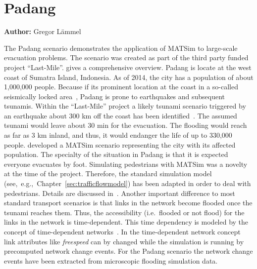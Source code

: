 \section{Padang}
\label{sec:padang}
\hfill \textbf{Author:} Gregor Lämmel

The Padang scenario demonstrates the application of MATSim to large-scale evacuation problems. The scenario was created as part of the third party funded project ``Last-Mile''. \citet{TaubenboeckEtAl2012ConcludingLastMilePaperNatHazards} gives a comprehensive overview.
Padang is locate at the west coast of Sumatra Island, Indonesia. 
As of 2014, the city has a population of about 1,000,000 people. 
Because if its prominent location at the coast in a so-called seismically locked area~\citep{McCloskey2010Padang2009Earthquake}, Padang is prone to earthquakes and subsequent tsunamis. 
Within the ``Last-Mile'' project a likely tsunami scenario triggered by an earthquake about 300 km off the coast has been identified~\citep{GosebergSchlurmann2009HazardMappingPadang}. 
The assumed tsunami would leave about 30 min for the evacuation. 
The flooding would reach as far as 3 km inland, and thus, it would endanger the life of up to 330,000 people. \citet{Laemmel_PhDThesis_2011} developed a MATSim scenario representing the city with its affected population. 
The specialty of the situation in Padang is that it is expected everyone evacuates by foot. 
Simulating pedestrians with MATSim was a novelty at the time of the project. 
Therefore, the standard simulation model (see,~e.g.,~Chapter~\ref{sec:trafficflowmodel}) has been adapted in order to deal with pedestrians. 
Details are discussed in~\citep{LaemmelKluepfelNagel2009EvacPadangAtBookTimmermanns}. 
Another important difference to most standard transport scenarios is that links in the network become flooded once the tsunami reaches them. Thus, the accessibility (i.e.~flooded or not flood) for the links in the network is time-dependent. This time dependency is modeled by the concept of time-dependent networks~\citep{LaemmelEtAl_TransResC_2010}. In the time-dependent network concept link attributes  like \emph{freespeed} can by changed while the simulation is running by precomputed network change events. For the Padang scenario the network change events have been extracted from microscopic flooding simulation data.

